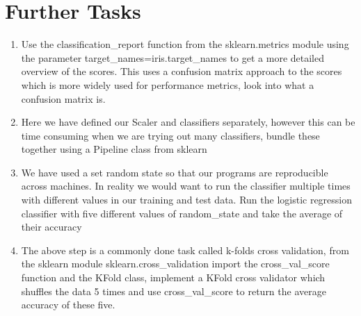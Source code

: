 \documentclass[12pt]{article}
\begin{document}
\begin{enumerate}
%


\end{enumerate}

\section{Further Tasks}
\begin{enumerate}
\item Use the classification\_report function from the sklearn.metrics module using the parameter target\_names=iris.target\_names to get a more detailed overview of the scores. This uses a confusion matrix approach to the scores which is more widely used for performance metrics, look into what a confusion matrix is.

\item Here we have defined our Scaler and classifiers separately, however this can be time consuming when we are trying out many classifiers, bundle these together using a Pipeline class from sklearn

\item We have used a set random state so that our programs are reproducible across machines. In reality we would want to run the classifier multiple times with different values in our training and test data. Run the logistic regression classifier with five different values of random\_state and take the average of their accuracy

\item The above step is a commonly done task called k-folds cross validation, from the sklearn module sklearn.cross\_validation import the cross\_val\_score function and the KFold class, implement a KFold cross validator which shuffles the data 5 times and use cross\_val\_score to return the average accuracy of these five.
\end{enumerate}
\end{document}
